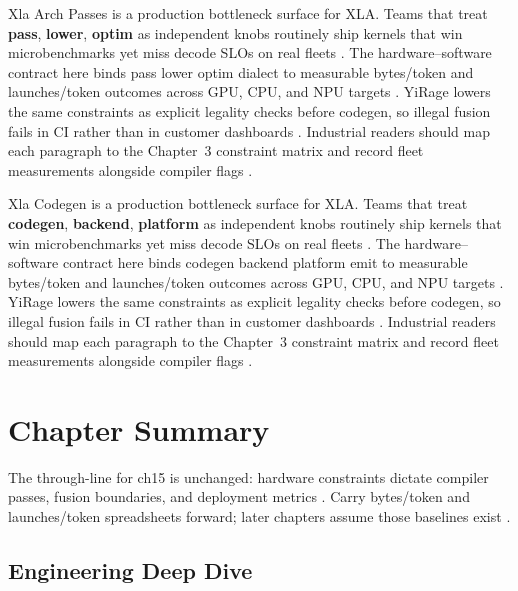 Xla Arch Passes is a production bottleneck surface for XLA. Teams that treat \textbf{pass}, \textbf{lower}, \textbf{optim} as independent knobs routinely ship kernels that win microbenchmarks yet miss decode SLOs on real fleets \citep{nvidia2022hopper,amd2024aie}. The hardware--software contract here binds pass lower optim dialect to measurable bytes/token and launches/token outcomes across GPU, CPU, and NPU targets \citep{semianalysis2024tma,dlbook}. YiRage lowers the same constraints as explicit legality checks before codegen, so illegal fusion fails in CI rather than in customer dashboards \citep{amd2024xdna,dao2022flashattention}. Industrial readers should map each paragraph to the Chapter~3 constraint matrix and record fleet measurements alongside compiler flags \citep{amd2024aie,kwon2023vllm}.

Xla Codegen is a production bottleneck surface for XLA. Teams that treat \textbf{codegen}, \textbf{backend}, \textbf{platform} as independent knobs routinely ship kernels that win microbenchmarks yet miss decode SLOs on real fleets \citep{semianalysis2024tma,dlbook}. The hardware--software contract here binds codegen backend platform emit to measurable bytes/token and launches/token outcomes across GPU, CPU, and NPU targets \citep{amd2024xdna,dao2022flashattention}. YiRage lowers the same constraints as explicit legality checks before codegen, so illegal fusion fails in CI rather than in customer dashboards \citep{amd2024aie,kwon2023vllm}. Industrial readers should map each paragraph to the Chapter~3 constraint matrix and record fleet measurements alongside compiler flags \citep{dlbook,nvidia2024cudagraphs}.

\section{Chapter Summary}
\label{sec:ch15_summary}

The through-line for ch15 is unchanged: hardware constraints dictate compiler passes, fusion boundaries, and deployment metrics \citep{memoryfloor2026,amd2024xdna}. Carry bytes/token and launches/token spreadsheets forward; later chapters assume those baselines exist \citep{semianalysis2024tma,dlbook}.


\subsection{Engineering Deep Dive}
\label{sec:ch15_deep_dive}

